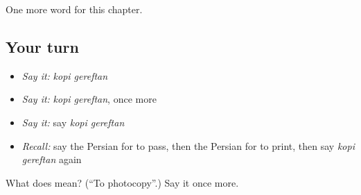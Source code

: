 \begin{grammarlens}[title={What you've built}]
One more word for this chapter.
\end{grammarlens}

\subsection*{Your turn}
\begin{itemize}
\raggedright
  \item \emph{Say it:} \emph{kopi gereftan}
  \item \emph{Say it:} \emph{kopi gereftan}, once more
  \item \emph{Say it:} say \emph{kopi gereftan}
  \item \emph{Recall:} say the Persian for to pass, then the Persian for to print, then say \emph{kopi gereftan} again
\end{itemize}

\begin{tcolorbox}[breakable,colback=teal!4,colframe=teal!35!black,title={Before you move on}]
What does   mean? (\textquotedblleft{}To photocopy\textquotedblright{}.) Say it once more.
\end{tcolorbox}
